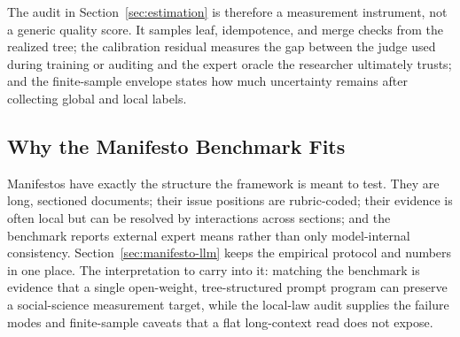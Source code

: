 The audit in Section~\ref{sec:estimation} is therefore a measurement
instrument, not a generic quality score. It samples leaf, idempotence, and
merge checks from the realized tree; the calibration residual measures the
gap between the judge used during training or auditing and the expert
oracle the researcher ultimately trusts; and the finite-sample envelope
states how much uncertainty remains after collecting global and local
labels.

\subsection{Why the Manifesto Benchmark Fits}

Manifestos have exactly the structure the framework is meant to test.
They are long, sectioned documents; their issue positions are rubric-coded;
their evidence is often local but can be resolved by interactions across
sections; and the benchmark reports external expert means rather than only
model-internal consistency. Section~\ref{sec:manifesto-llm} keeps the
empirical protocol and numbers in one place. The interpretation to carry
into it: matching the benchmark is evidence that a
single open-weight, tree-structured prompt program can preserve a
social-science measurement target, while the local-law audit supplies the
failure modes and finite-sample caveats that a flat long-context read does
not expose.
